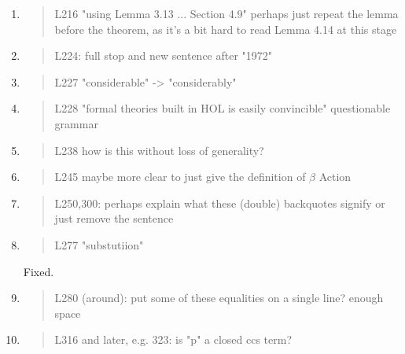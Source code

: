 \begin{enumerate}
\item \begin{quote}
    L216 "using Lemma 3.13 ... Section 4.9" perhaps just repeat the lemma before the theorem, as it's a bit hard to read Lemma 4.14 at this stage 
  \end{quote}

\item \begin{quote}
    L224: full stop and new sentence after "1972"
  \end{quote}

\item \begin{quote}
    L227 "considerable" -> "considerably"
  \end{quote}

\item \begin{quote}
    L228 "formal theories built in HOL is easily convincible" questionable grammar
  \end{quote}

\item \begin{quote}
    L238 how is this without loss of generality?
  \end{quote}

\item \begin{quote}
    L245 maybe more clear to just give the definition of $\beta$ Action 
  \end{quote}

\item \begin{quote}
    L250,300: perhaps explain what these (double) backquotes signify or just remove the sentence
  \end{quote}

\item \begin{quote}
    L277 "substutiion"
  \end{quote}
  Fixed.
  
\item \begin{quote}
    L280 (around): put some of these equalities on a single line? enough space
  \end{quote}

\item \begin{quote}
    L316 and later, e.g. 323: is "p" a closed ccs term?
  \end{quote}


\end{enumerate}
